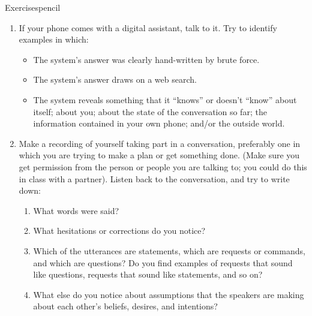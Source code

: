 \begin{tblsfilledsymbol}{Exercises}{pencil}

\begin{enumerate}

\item  If your phone comes with a digital assistant, talk to it.  Try to identify examples in which:
\begin{itemize}
\item The system's answer was clearly hand-written by brute force.
\item The system's answer draws on a web search.
\item The system reveals something that it ``knows'' or doesn't ``know'' about itself; about you; about the state of the conversation so far; the information contained in your own phone; and/or the outside world.
\end{itemize}

\item Make a recording of yourself taking part in a conversation, preferably one in which you are trying to make a plan or get something done. (Make sure you get permission from the person or people you are talking to; you could do this in class with a partner). Listen back to the conversation, and try to write down:
\begin{enumerate}
  \item What words were said?
\item What hesitations or corrections do you notice?
\item Which of the utterances are statements, which are requests or commands, and which are questions? Do you find examples of requests that sound like questions, requests that sound like statements, and so on?
\item What else do you notice about assumptions that the speakers are making about each other's beliefs, desires, and intentions?
\end{enumerate}


\end{enumerate}
\end{tblsfilledsymbol}
